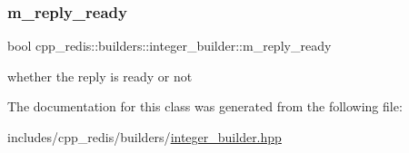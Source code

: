\subsubsection{\texorpdfstring{m\+\_\+reply\+\_\+ready}{m\_reply\_ready}}
{\footnotesize\ttfamily bool cpp\+\_\+redis\+::builders\+::integer\+\_\+builder\+::m\+\_\+reply\+\_\+ready\hspace{0.3cm}{\ttfamily [private]}}

whether the reply is ready or not 

The documentation for this class was generated from the following file\+:\begin{DoxyCompactItemize}
\item 
includes/cpp\+\_\+redis/builders/\hyperlink{integer__builder_8hpp}{integer\+\_\+builder.\+hpp}\end{DoxyCompactItemize}
